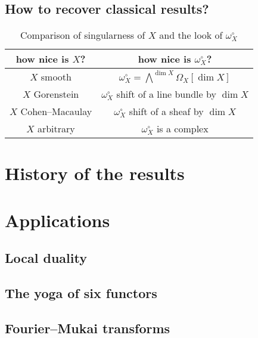 \documentclass[10pt,a4paper]{article}
\begin{document}
\subsection{How to recover classical results?}
\label{subsection:classical-results}

\begin{table}
  \centering
  \begin{tabular}{cc}
    \toprule
    how nice is $X$? & how nice is $\omega_X^\circ$? \\\midrule
    $X$ smooth & $\omega_X^\circ=\bigwedge^{\dim X}\Omega_X[\dim X]$ \\
    $X$ Gorenstein & $\omega_X^\circ$ shift of a line bundle by $\dim X$ \\
    $X$ Cohen--Macaulay & $\omega_X^\circ$ shift of a sheaf by $\dim X$ \\
    $X$ arbitrary & $\omega_X^\circ$ is a complex
  \end{tabular}
  \caption{Comparison of singularness of $X$ and the look of $\omega_X^\circ$}
  \label{table:comparison-X-dualising-sheaf}
\end{table}

\section{History of the results}
\label{section:history}


\section{Applications}
\label{section:applications-grothendieck-duality}
\subsection{Local duality}
\label{subsection:local-duality}

\subsection{The yoga of six functors}
\label{subsection:six-functors-yoga}

\subsection{Fourier--Mukai transforms}
\label{subsection:fourier-mukai-transforms}

\printbibliography
\end{document}
